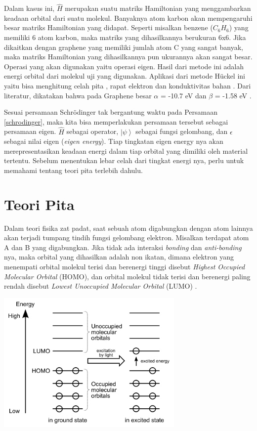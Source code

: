 \documentclass[12pt,a4paper]{report}
\newcommand{\ket}[1]{\ensuremath{\left|#1\right\rangle}}
\begin{document}
	Dalam kasus ini, {$\hat{H}$} merupakan suatu matriks Hamiltonian yang menggambarkan keadaan orbital dari suatu molekul. Banyaknya atom karbon akan mempengaruhi besar matriks Hamiltonian yang didapat. Seperti misalkan benzene ({$C_6H_6$}) yang memiliki 6 atom karbon, maka matriks yang dihasilkannya berukuran 6x6.
	Jika dikaitkan dengan graphene yang memiliki jumlah atom C yang sangat banyak, maka matriks Hamiltonian yang dihasilkannya pun ukurannya akan sangat besar. Operasi yang akan digunakan yaitu operasi eigen. Hasil dari metode ini adalah energi orbital dari molekul uji yang digunakan. Aplikasi dari metode Hückel ini yaitu bisa menghitung celah pita \cite{Imamura2018}, rapat elektron dan konduktivitas bahan \cite{Siregar2014}. Dari literatur, dikatakan bahwa pada Graphene besar $\alpha$ = -10.7 eV dan $\beta$ = -1.58 eV \cite{Ni2015}.
	
	Sesuai persamaan Schrödinger tak bergantung waktu pada Persamaan \eqref{schrodinger}, maka kita bisa memperlakukan persamaan tersebut sebagai persamaan eigen. $\hat{H}$ sebagai operator, $\ket{\psi}$ sebagai fungsi gelombang, dan $\epsilon$ sebagai nilai eigen (\textit{eigen energy}). Tiap tingkatan eigen energy nya akan merepresentasikan keadaan energi dalam tiap orbital yang dimiliki oleh material tertentu. Sebelum menentukan lebar celah dari tingkat energi nya, perlu untuk memahami tentang teori pita terlebih dahulu.
	
	\section{Teori Pita}
	
	Dalam teori fisika zat padat, saat sebuah atom digabungkan dengan atom lainnya akan terjadi tumpang tindih fungsi gelombang elektron. Misalkan terdapat atom A dan B yang digabungkan. Jika tidak ada interaksi \textit{bonding} dan \textit{anti-bonding} nya, maka orbital yang dihasilkan adalah non ikatan, dimana elektron yang menempati orbital molekul terisi dan berenergi tinggi disebut \textit{Highest Occupied Molecular Orbital} (HOMO), dan orbital molekul tidak terisi dan berenergi paling rendah disebut \textit{Lowest Unoccupied Molecular Orbital} (LUMO) \cite{Risdiana2014}.
	\begin{center}
		\includegraphics[width=9.1cm]{gambar/homolumo.png}
	\end{center}
	
\end{document}
